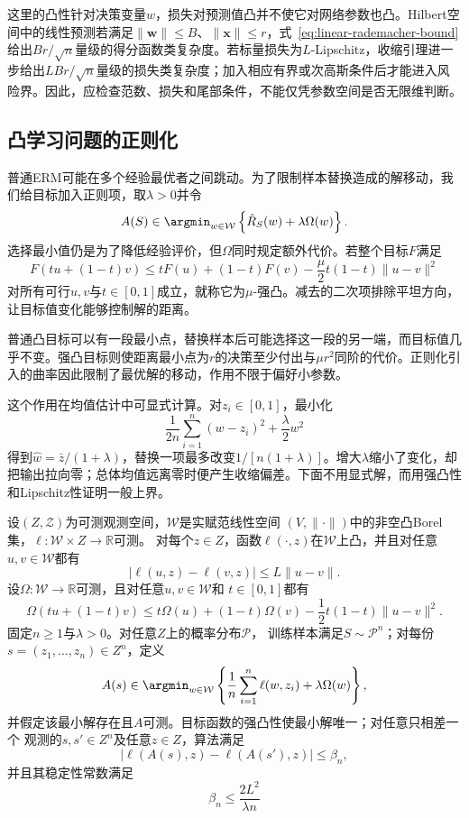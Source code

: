这里的凸性针对决策变量$w$，损失对预测值凸并不使它对网络参数也凸。Hilbert空间中的线性预测若满足$\|\bm w\|\leq B$、$\|\bm x\|\leq r$，式~\eqref{eq:linear-rademacher-bound}给出$Br/\sqrt n$量级的得分函数类复杂度。若标量损失为$L$-Lipschitz，收缩引理进一步给出$LBr/\sqrt n$量级的损失类复杂度；加入相应有界或次高斯条件后才能进入风险界。因此，应检查范数、损失和尾部条件，不能仅凭参数空间是否无限维判断。

\subsection{凸学习问题的正则化}

普通ERM可能在多个经验最优者之间跳动。为了限制样本替换造成的解移动，我们给目标加入正则项，取$\lambda>0$并令
\begin{equation}
 A(S)\in\argmin_{w\in\mathcal W}
 \left\{\hat R_S(w)+\lambda\Omega(w)\right\}.
 \label{eq:regularized-erm}
\end{equation}
选择最小值仍是为了降低经验评价，但$\Omega$同时规定额外代价。若整个目标$F$满足
\begin{equation}
 F(tu+(1-t)v)\leq tF(u)+(1-t)F(v)
 -\frac\mu2t(1-t)\|u-v\|^2
 \label{eq:strong-convexity}
\end{equation}
对所有可行$u,v$与$t\in[0,1]$成立，就称它为$\mu$-强凸。减去的二次项排除平坦方向，让目标值变化能够控制解的距离。

普通凸目标可以有一段最小点，替换样本后可能选择这一段的另一端，而目标值几乎不变。强凸目标则使距离最小点为$r$的决策至少付出与$\mu r^2$同阶的代价。正则化引入的曲率因此限制了最优解的移动，作用不限于偏好小参数。

这个作用在均值估计中可显式计算。对$z_i\in[0,1]$，最小化
\[
 \frac1{2n}\sum_{i=1}^n(w-z_i)^2+\frac\lambda2w^2
\]
得到$\hat w=\bar z/(1+\lambda)$，替换一项最多改变$1/[n(1+\lambda)]$。增大$\lambda$缩小了变化，却把输出拉向零；总体均值远离零时便产生收缩偏差。下面不用显式解，而用强凸性和Lipschitz性证明一般上界。

\begin{theorem}[强凸正则化的稳定性]
\label{thm:regularized-erm-stability}
设$(Z,\mathcal Z)$为可测观测空间，$\mathcal W$是实赋范线性空间
$(V,\|\cdot\|)$中的非空凸Borel集，$\ell:\mathcal W\times Z\to\mathbb R$可测。
对每个$z\in Z$，函数$\ell(\cdot,z)$在$\mathcal W$上凸，并且对任意
$u,v\in\mathcal W$都有
\[
 |\ell(u,z)-\ell(v,z)|\leq L\|u-v\|.
\]
设$\Omega:\mathcal W\to\mathbb R$可测，且对任意$u,v\in\mathcal W$和
$t\in[0,1]$都有
\[
 \Omega(tu+(1-t)v)
 \leq t\Omega(u)+(1-t)\Omega(v)-\frac12t(1-t)\|u-v\|^2.
\]
固定$n\geq1$与$\lambda>0$。对任意$Z$上的概率分布$\mathcal P$，
训练样本满足$S\sim\mathcal P^n$；对每份$s=(z_1,\ldots,z_n)\in Z^n$，定义
\[
 A(s)\in\argmin_{w\in\mathcal W}
 \left\{\frac1n\sum_{i=1}^n\ell(w,z_i)+\lambda\Omega(w)\right\},
\]
并假定该最小解存在且$A$可测。目标函数的强凸性使最小解唯一；对任意只相差一个
观测的$s,s'\in Z^n$及任意$z\in Z$，算法满足
\[
 |\ell(A(s),z)-\ell(A(s'),z)|\leq\beta_n,
\]
并且其稳定性常数满足
\begin{equation}
 \beta_n\leq\frac{2L^2}{\lambda n}
 \label{eq:regularized-stability-bound}
\end{equation}
\end{theorem}

